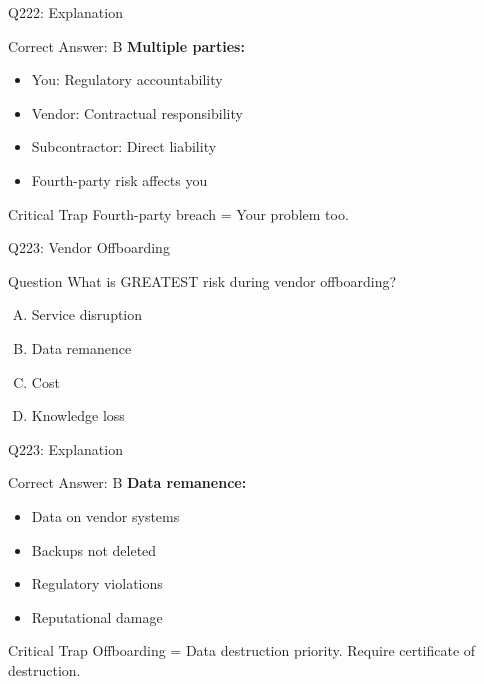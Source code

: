 \documentclass{beamer}
\begin{document}
	\begin{frame}{Q222: Explanation}
		\begin{block}{Correct Answer: B}
			\textbf{Multiple parties:}
			\begin{itemize}
				\item You: Regulatory accountability
				\item Vendor: Contractual responsibility
				\item Subcontractor: Direct liability
				\item Fourth-party risk affects you
			\end{itemize}
		\end{block}
		\begin{alertblock}{Critical Trap}
			Fourth-party breach = Your problem too.
		\end{alertblock}
	\end{frame}
	
	\begin{frame}{Q223: Vendor Offboarding}
		\begin{block}{Question}
			What is GREATEST risk during vendor offboarding?
		\end{block}
		\begin{enumerate}[(A)]
			\item Service disruption
			\item Data remanence
			\item Cost
			\item Knowledge loss
		\end{enumerate}
	\end{frame}
	
	\begin{frame}{Q223: Explanation}
		\begin{block}{Correct Answer: B}
			\textbf{Data remanence:}
			\begin{itemize}
				\item Data on vendor systems
				\item Backups not deleted
				\item Regulatory violations
				\item Reputational damage
			\end{itemize}
		\end{block}
		\begin{alertblock}{Critical Trap}
			Offboarding = Data destruction priority.
			Require certificate of destruction.
		\end{alertblock}
	\end{frame}
	
\end{document}
